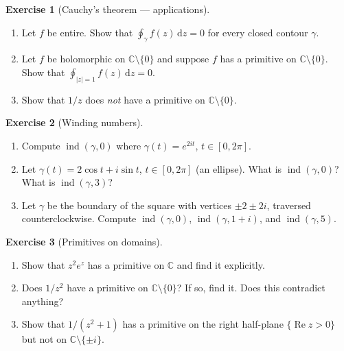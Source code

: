 \documentclass[12pt,a4paper,openany]{book}
\theoremstyle{definition}
\newtheorem{exercise}{Exercise}[chapter]
\theoremstyle{plain}
\theoremstyle{remark}
\newcommand{\C}{\mathbb{C}}
\DeclareMathOperator{\re}{Re}
\DeclareMathOperator{\ind}{ind}
\newcommand{\dd}{\mathrm{d}}
\newcommand{\abs}[1]{\left|#1\right|}
\begin{document}
\begin{exercise}[Cauchy's theorem --- applications]\label{exo:cauchy-applications}
\leavevmode
\begin{enumerate}[label=\textup{(\alph*)}]
  \item Let $f$ be entire.  Show that $\oint_\gamma f(z)\,\dd z = 0$ for
    every closed contour $\gamma$.
  \item Let $f$ be holomorphic on $\C\setminus\{0\}$ and suppose $f$ has a
    primitive on $\C\setminus\{0\}$.  Show that
    $\oint_{\abs{z}=1}f(z)\,\dd z = 0$.
  \item Show that $1/z$ does \emph{not} have a primitive on $\C\setminus\{0\}$.
\end{enumerate}
\end{exercise}

\begin{exercise}[Winding numbers]\label{exo:winding-numbers}
\leavevmode
\begin{enumerate}[label=\textup{(\alph*)}]
  \item Compute $\ind(\gamma,0)$ where $\gamma(t)=e^{2it}$, $t\in[0,2\pi]$.
  \item Let $\gamma(t) = 2\cos t + i\sin t$, $t\in[0,2\pi]$ (an ellipse).
    What is $\ind(\gamma,0)$?  What is $\ind(\gamma,3)$?
  \item Let $\gamma$ be the boundary of the square with vertices $\pm 2\pm 2i$,
    traversed counterclockwise.  Compute $\ind(\gamma,0)$, $\ind(\gamma,1+i)$,
    and $\ind(\gamma,5)$.
\end{enumerate}
\end{exercise}

\begin{exercise}[Primitives on domains]\label{exo:primitives}
\leavevmode
\begin{enumerate}[label=\textup{(\alph*)}]
  \item Show that $z^2 e^z$ has a primitive on $\C$ and find it explicitly.
  \item Does $1/z^2$ have a primitive on $\C\setminus\{0\}$?  If so, find it.
    Does this contradict anything?
  \item Show that $1/(z^2+1)$ has a primitive on the right half-plane
    $\{\re z > 0\}$ but not on $\C\setminus\{\pm i\}$.
\end{enumerate}
\end{exercise}
\end{document}
